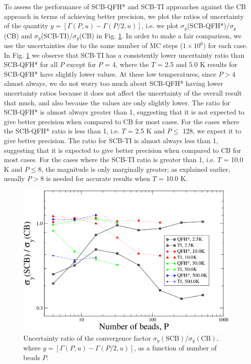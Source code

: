     To assess the performance of SCB-QFH* and SCB-TI approaches against the CB approach in terms of achieving better precision, we plot the ratios of uncertainty of the quantity $y = [\Gamma(P,u) - \Gamma(P/2,u)]$, i.e. we plot $\sigma_y$(SCB-QFH*)/$\sigma_y$(CB) and $\sigma_y$(SCB-TI)/$\sigma_y$(CB) in Fig. \ref{uncRatios}. In order to make a fair comparison, we use the uncertainties due to the same number of MC steps ($1\times10^6$) for each case. In Fig. \ref{uncRatios} we observe that SCB-TI has a consistently lower uncertainty ratio than SCB-QFH*  for all $P$ except for $P$ = 4, where the $T$ = 2.5 and 5.0 K results for SCB-QFH* have slightly lower values. At these low temperatures, since $P > 4$ almost always, we do not worry too much about SCB-QFH* having lower uncertainty ratios because it does not affect the uncertainty of the overall result that much, and also because the values are only slightly lower. The ratio for SCB-QFH* is almost always greater than 1, suggesting that it is not expected to give better precision when compared to CB for most cases. For the cases where the SCB-QFH* ratio is less than 1, i.e. $T$ = 2.5 K and $P \le$ 128, we expect it to give better precision. The ratio for SCB-TI is almost always less than 1, suggesting that it is expected to give better precision when compared to CB for most cases. For the cases where the SCB-TI ratio is greater than 1, i.e. $T$ = 10.0 K and $P \le 8$, the magnitude is only marginally greater; as explained earlier, usually $P > 8$ is needed for accurate results when $T$ = 10.0 K.
    \begin{figure}
        \centering
        \includegraphics[scale=0.3,keepaspectratio]{Chapter-3/Figures/uncRatiosOct19.png}
        \caption{Uncertainty ratio of the convergence factor $\sigma_y (\text{SCB}) / \sigma_y (\text{CB})$, where $y = [\Gamma(P,u) - \Gamma(P/2,u)]$, as a function of number of beads $P$.}\label{uncRatios}
    \end{figure}


